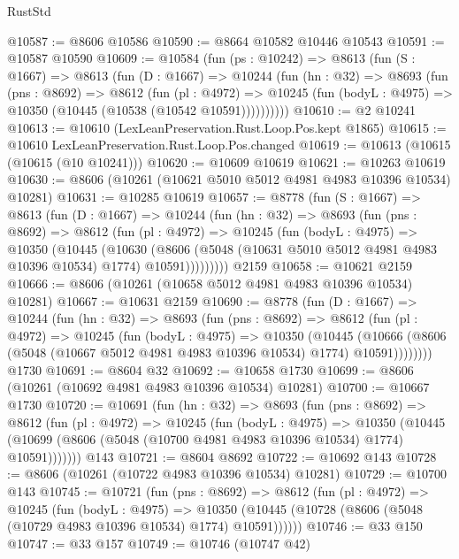 \begin{lexlean}{RustStd}
\begin{coremodule}
@10587 := @8606 @10586
@10590 := @8664 @10582 @10446 @10543
@10591 := @10587 @10590
@10609 := @10584
    (fun (ps : @10242) =>
    @8613
      (fun (S : @1667) =>
      @8613
        (fun (D : @1667) =>
        @10244
          (fun (hn : @32) =>
          @8693
            (fun (pns : @8692) =>
            @8612
              (fun (pl : @4972) =>
              @10245 (fun (bodyL : @4975) => @10350 (@10445 (@10538 (@10542 @10591))))))))))
@10610 := @2 @10241
@10613 := @10610 (LexLeanPreservation.Rust.Loop.Pos.kept @1865)
@10615 := @10610 LexLeanPreservation.Rust.Loop.Pos.changed
@10619 := @10613 (@10615 (@10615 (@10 @10241)))
@10620 := @10609 @10619
@10621 := @10263 @10619
@10630 := @8606 (@10261 (@10621 @5010 @5012 @4981 @4983 @10396 @10534) @10281)
@10631 := @10285 @10619
@10657 := @8778
    (fun (S : @1667) =>
    @8613
      (fun (D : @1667) =>
      @10244
        (fun (hn : @32) =>
        @8693
          (fun (pns : @8692) =>
          @8612
            (fun (pl : @4972) =>
            @10245
              (fun (bodyL : @4975) =>
              @10350
                (@10445
                  (@10630
                    (@8606
                      (@5048 (@10631 @5010 @5012 @4981 @4983 @10396 @10534) @1774)
                      @10591)))))))))
    @2159
@10658 := @10621 @2159
@10666 := @8606 (@10261 (@10658 @5012 @4981 @4983 @10396 @10534) @10281)
@10667 := @10631 @2159
@10690 := @8778
    (fun (D : @1667) =>
    @10244
      (fun (hn : @32) =>
      @8693
        (fun (pns : @8692) =>
        @8612
          (fun (pl : @4972) =>
          @10245
            (fun (bodyL : @4975) =>
            @10350
              (@10445
                (@10666 (@8606 (@5048 (@10667 @5012 @4981 @4983 @10396 @10534) @1774) @10591))))))))
    @1730
@10691 := @8604 @32
@10692 := @10658 @1730
@10699 := @8606 (@10261 (@10692 @4981 @4983 @10396 @10534) @10281)
@10700 := @10667 @1730
@10720 := @10691
    (fun (hn : @32) =>
    @8693
      (fun (pns : @8692) =>
      @8612
        (fun (pl : @4972) =>
        @10245
          (fun (bodyL : @4975) =>
          @10350
            (@10445 (@10699 (@8606 (@5048 (@10700 @4981 @4983 @10396 @10534) @1774) @10591)))))))
    @143
@10721 := @8604 @8692
@10722 := @10692 @143
@10728 := @8606 (@10261 (@10722 @4983 @10396 @10534) @10281)
@10729 := @10700 @143
@10745 := @10721
    (fun (pns : @8692) =>
    @8612
      (fun (pl : @4972) =>
      @10245
        (fun (bodyL : @4975) =>
        @10350 (@10445 (@10728 (@8606 (@5048 (@10729 @4983 @10396 @10534) @1774) @10591))))))
@10746 := @33 @150
@10747 := @33 @157
@10749 := @10746 (@10747 @42)

\end{coremodule}
\end{lexlean}
